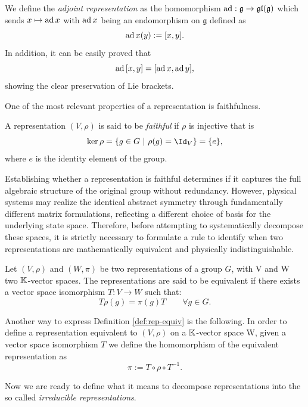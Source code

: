 \begin{example}
	We define the \textit{adjoint representation} as the homomorphism $\operatorname{ad}: \mathfrak{g} \to \mathfrak{gl}(\mathfrak{g})$ which sends $x \mapsto \operatorname{ad}{x}$ with $\operatorname{ad}{x}$ being an endomorphism on $\mathfrak{g}$ defined as \[ \operatorname{ad}{x}(y) := [x,y].\]
	In addition, it can be easily proved that \[
		\operatorname{ad}{[x,y]} = [\operatorname{ad}{x},\operatorname{ad}{y}],
	\]
	showing the clear preservation of Lie brackets.
\end{example}

\noindent One of the most relevant properties of a representation is faithfulness.
\begin{definition}\label{def:rep-faith}
	A representation $(V, \rho)$ is said to be \textit{faithful} if $\rho$ is injective that is
	\[
		\ker{\rho} = \{g \in G \ | \ \rho(g) = \Id_V\} = \{e\},
	\]
	where $e$ is the identity element of the group.
\end{definition}

Establishing whether a representation is faithful determines if it captures the full algebraic structure of the original group without redundancy. However, physical systems may realize the identical abstract symmetry through fundamentally different matrix formulations, reflecting a different choice of basis for the underlying state space. Therefore, before attempting to systematically decompose these spaces, it is strictly necessary to formulate a rule to identify when two representations are mathematically equivalent and physically indistinguishable.

\begin{definition} \label{def:rep-equiv}
	Let $(V, \rho)$ and $(W, \pi)$ be two representations of a group $G$, with V and W two $\mathbb{K}$-vector spaces. The representations are said to be equivalent if there exists a vector space isomorphism $T: V \to W$ such that:
	\[
		T\rho(g) = \pi(g)T \qquad \forall g \in G.
	\]
\end{definition}

\begin{remark}
	Another way to express Definition \ref{def:rep-equiv} is the following. In order to define a representation equivalent to $(V, \rho)$ on a $\mathbb{K}$-vector space W, given a vector space isomorphism $T$ we define the homomorphism of the equivalent representation as
	\[
	\pi := T \circ \rho \circ T^{-1}.
	\]
\end{remark}

\noindent Now we are ready to define what it means to decompose representations into the so called \textit{irreducible representations}.

